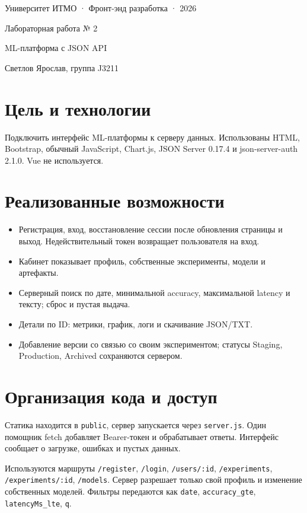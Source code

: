 \documentclass[11pt,a4paper]{article}
\begin{document}
\begin{center}
{\small Университет ИТМО · Фронт-энд разработка · 2026}\par
{\LARGE Лабораторная работа № 2}\par
{\large ML-платформа с JSON API}\par
Светлов Ярослав, группа J3211
\end{center}
\section*{Цель и технологии}
Подключить интерфейс ML-платформы к серверу данных. Использованы HTML, Bootstrap, обычный JavaScript, Chart.js, JSON Server 0.17.4 и json-server-auth 2.1.0. Vue не используется.
\section*{Реализованные возможности}
\begin{itemize}
\item Регистрация, вход, восстановление сессии после обновления страницы и выход. Недействительный токен возвращает пользователя на вход.
\item Кабинет показывает профиль, собственные эксперименты, модели и артефакты.
\item Серверный поиск по дате, минимальной accuracy, максимальной latency и тексту; сброс и пустая выдача.
\item Детали по ID: метрики, график, логи и скачивание JSON/TXT.
\item Добавление версии со связью со своим экспериментом; статусы Staging, Production, Archived сохраняются сервером.
\end{itemize}

\section*{Организация кода и доступ}
Статика находится в \texttt{public}, сервер запускается через \texttt{server.js}. Один помощник fetch добавляет Bearer-токен и обрабатывает ответы. Интерфейс сообщает о загрузке, ошибках и пустых данных.

Используются маршруты \texttt{/register}, \texttt{/login}, \texttt{/users/:id}, \texttt{/experiments}, \texttt{/experiments/:id}, \texttt{/models}. Сервер разрешает только свой профиль и изменение собственных моделей. Фильтры передаются как \texttt{date}, \texttt{accuracy\_gte}, \texttt{latencyMs\_lte}, \texttt{q}.
\end{document}
